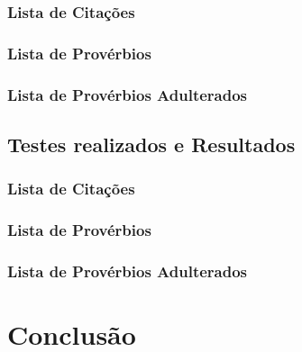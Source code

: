 \documentclass[11pt,a4paper]{report}
\begin{document}
\subsection{Lista de Citações}


\subsection{Lista de Provérbios}


\subsection{Lista de Provérbios Adulterados}


\section{Testes realizados e Resultados}
\subsection{Lista de Citações}


\subsection{Lista de Provérbios}


\subsection{Lista de Provérbios Adulterados}


\chapter{Conclusão}
\label{chap:concl}
\end{document}
